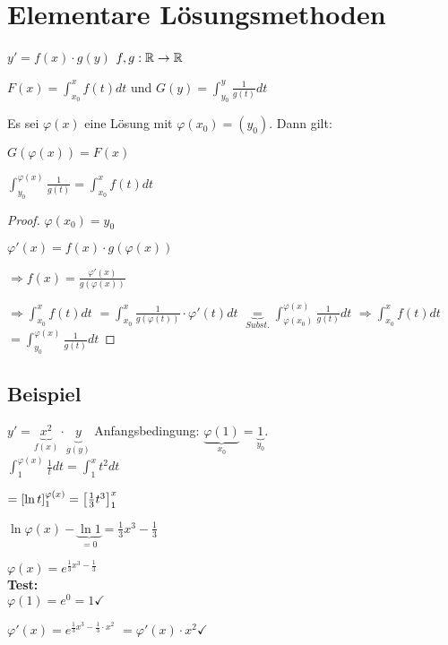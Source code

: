 \renewcommand{\ldate}{2015-12-04}

\section{Elementare Lösungsmethoden}

\begin{satz}
$y' = f(x) \cdot g(y)$ $ f,g: \mathbb{R} \rightarrow \mathbb{R}$

$F(x) = \int_{x_0}^{x} f(t) dt$ und $G(y) = \int_{y_0}^{y} \frac{1}{g(t)} dt$

Es sei $\varphi(x)$ eine Lösung mit $\varphi(x_0) = (y_0)$. Dann gilt:

$G(\varphi(x)) = F(x)$

$\int_{y_0}^{\varphi(x)} \frac{1}{g(t)} = \int_{x_0}^{x} f(t) dt$ 
\end{satz}

\begin{proof}
$\varphi(x_0) = y_0$

$\varphi'(x) = f(x) \cdot g(\varphi(x))$

$\Rightarrow f(x) = \frac{\varphi'(x)}{g(\varphi(x))}$

$\Rightarrow \int_{x_0}^{x} f(t) dt $
$= \int_{x_0}^{x} \frac{1}{g(\varphi(t))} \cdot \varphi'(t) dt $
$\underbrace{=}_{Subst.} \int_{\varphi(x_0)}^{\varphi(x)} \frac{1}{g(t)} dt$
$\Rightarrow \int_{x_0}^{x} f(t) dt $
$=\int_{y_0}^{\varphi(x)}\frac{1}{g(t)} dt$
\end{proof}

\subsection{Beispiel}
$y' = \underbrace{x^2}_{f(x)} \cdot \underbrace{y}_{g(y)}$ Anfangsbedingung: $ \underbrace{\varphi(1)}_{x_0} = \underbrace{1}_{y_0}$.\\

$\int_{1}^{\varphi(x)} \frac{1}{t} dt =\int_{1}^{x} t^2 dt$

$= \left[ \ln t \right] _1^{\varphi(x)}= \left[ \frac{1}{3} t^3 \right] _1^x$

$ \ln \varphi(x) - \underbrace{\ln 1}_{=0} = \frac{1}{3} x^3 - \frac{1}{3}$

$\varphi(x) = e^{\frac{1}{3} x^3 - \frac{1}{3}}$\\

\textbf{Test:}\\
$ \varphi(1) = e^0 = 1 \checkmark$

$\varphi'(x) = e^{\frac{1}{3} x^3 - \frac{1}{3} \cdot x^2}$
$=\varphi'(x) \cdot x^2 \checkmark$

